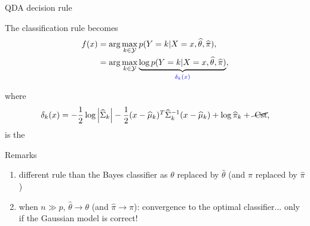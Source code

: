 \begin{frame}{QDA decision rule}

The classification rule becomes
\begin{align*}
 f(x)&= \arg \max_{k \in\mathcal{Y}  }p( Y= k | X=x, \widehat{\theta},\widehat{\pi}),\\
 &= \arg \max_{k \in\mathcal{Y}  }
 \underbrace{ \log p( Y= k | X=x, \widehat{\theta},\widehat{\pi} )}_{{\textcolor{blue}{\delta_k(x)}}},
\end{align*}\vspace{-3mm}

\noindent where \vspace{-2mm}
\begin{align*}
 \delta_k(x)= -\frac{1}{2} \log\left|\widehat{\Sigma}_k\right| - \frac{1}{2}
 (x-\widehat{\mu}_k)^T \widehat{\Sigma}_k^{-1} (x-\widehat{\mu}_k)+ \log \widehat{\pi}_k + \cancel{ \textrm{ Cst} },
\end{align*}
is the 

\begin{block}{Remarks}
   \begin{enumerate}
      \item different rule than the Bayes classifier as $\theta$  replaced by $\widehat{\theta}$
      (and $\pi$ replaced by  $\widehat{\pi}$)
      \item when $ n \gg p$, $\widehat{\theta} \rightarrow \theta$ (and  $\widehat{\pi} \rightarrow \pi$): convergence to the optimal classifier... only if the Gaussian model is correct!
   \end{enumerate}

\end{block}


\end{frame}


